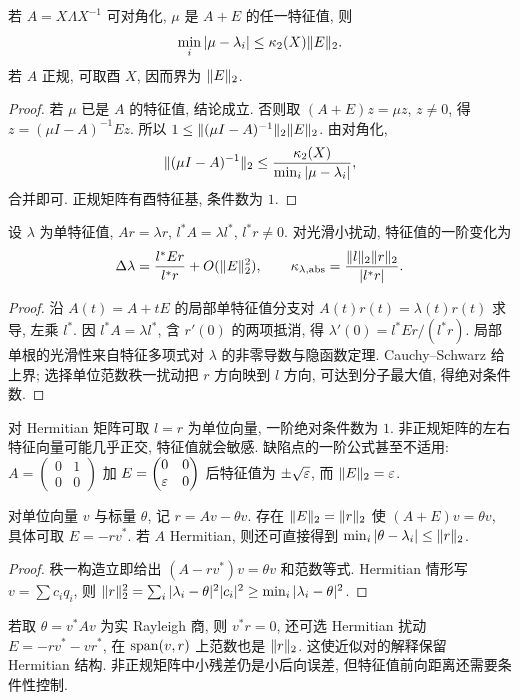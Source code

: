 \begin{theorem}\label{thm:bauer}
若 $A=X\Lambda X^{-1}$ 可对角化, $\mu$ 是 $A+E$ 的任一特征值, 则
\[
\min_i|\mu-\lambda_i|\le\kappa_2(X)\lVert E\rVert_2.
\]
若 $A$ 正规, 可取酉 $X$, 因而界为 $\lVert E\rVert_2$.
\end{theorem}
\begin{proof}
若 $\mu$ 已是 $A$ 的特征值, 结论成立. 否则取 $(A+E)z=\mu z$, $z\ne0$, 得
$z=(\mu I-A)^{-1}Ez$.
所以 $1\le\lVert (\mu I-A)^{-1}\rVert_2\lVert E\rVert_2$. 由对角化,
\[
\lVert (\mu I-A)^{-1}\rVert_2
\le\frac{\kappa_2(X)}{\min_i|\mu-\lambda_i|},
\]
合并即可. 正规矩阵有酉特征基, 条件数为 $1$.
\end{proof}
\begin{proposition}
设 $\lambda$ 为单特征值, $Ar=\lambda r$, $l^*A=\lambda l^*$, $l^*r\ne0$. 对光滑小扰动, 特征值的一阶变化为
\[
\Delta\lambda=\frac{l^*Er}{l^*r}+O(\lVert E\rVert_2^2),
\qquad \kappa_{\lambda,\rm abs}=\frac{\lVert l\rVert_2\lVert r\rVert_2}{|l^*r|}.
\]
\end{proposition}
\begin{proof}
沿 $A(t)=A+tE$ 的局部单特征值分支对 $A(t)r(t)=\lambda(t)r(t)$ 求导, 左乘 $l^*$. 因 $l^*A=\lambda l^*$, 含 $r'(0)$ 的两项抵消, 得 $\lambda'(0)=l^*Er/(l^*r)$. 局部单根的光滑性来自特征多项式对 $\lambda$ 的非零导数与隐函数定理. Cauchy--Schwarz 给上界; 选择单位范数秩一扰动把 $r$ 方向映到 $l$ 方向, 可达到分子最大值, 得绝对条件数.
\end{proof}
对 Hermitian 矩阵可取 $l=r$ 为单位向量, 一阶绝对条件数为 $1$. 非正规矩阵的左右特征向量可能几乎正交, 特征值就会敏感. 缺陷点的一阶公式甚至不适用: $A=\begin{pmatrix}0&1\\0&0\end{pmatrix}$ 加 $E=\begin{pmatrix}0&0\\\varepsilon&0\end{pmatrix}$ 后特征值为 $\pm\sqrt{\varepsilon}$, 而 $\lVert E\rVert_2=\varepsilon$.

\begin{proposition}[近似特征对的后向解释]\label{prop:eigres}
对单位向量 $v$ 与标量 $\theta$, 记 $r=Av-\theta v$. 存在 $\lVert E\rVert_2=\lVert r\rVert_2$ 使 $(A+E)v=\theta v$, 具体可取 $E=-rv^*$. 若 $A$ Hermitian, 则还可直接得到 $\min_i|\theta-\lambda_i|\le\lVert r\rVert_2$.
\end{proposition}
\begin{proof}
秩一构造立即给出 $(A-rv^*)v=\theta v$ 和范数等式. Hermitian 情形写 $v=\sum c_iq_i$, 则 $\lVert r\rVert_2^2=\sum_i|\lambda_i-\theta|^2|c_i|^2\ge\min_i|\lambda_i-\theta|^2$.
\end{proof}
若取 $\theta=v^*Av$ 为实 Rayleigh 商, 则 $v^*r=0$, 还可选 Hermitian 扰动 $E=-rv^*-vr^*$, 在 $\operatorname{span}(v,r)$ 上范数也是 $\lVert r\rVert_2$. 这使近似对的解释保留 Hermitian 结构. 非正规矩阵中小残差仍是小后向误差, 但特征值前向距离还需要条件性控制.


